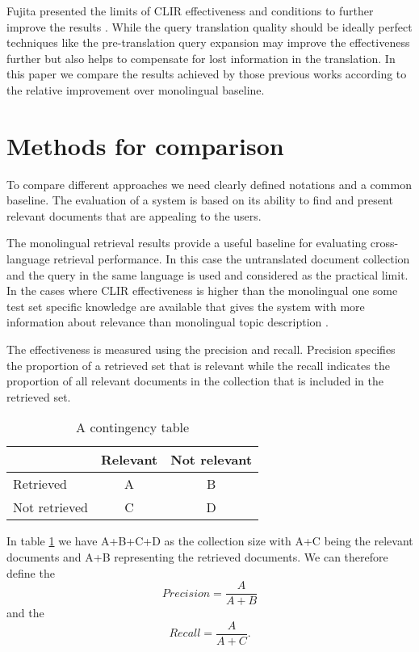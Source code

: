 \documentclass[journal]{IEEEtran}
\begin{document}
Fujita presented the limits of CLIR effectiveness and conditions to further improve the results \cite{fujita01}.
While the query translation quality should be ideally perfect techniques like the pre-translation query expansion may improve the effectiveness further but also helps to compensate for lost information in the translation.
In this paper we compare the results achieved by those previous works according to the relative improvement over monolingual baseline.



\section{Methods for comparison}
To compare different approaches we need clearly defined notations and a common baseline.
The evaluation of a system is based on its ability to find and present relevant documents that are appealing to the users.

The monolingual retrieval results provide a useful baseline for evaluating cross-language retrieval performance.
In this case the untranslated document collection and the query in the same language is used and considered as the practical limit.
In the cases where CLIR effectiveness is higher than the monolingual one some test set specific knowledge are available that gives the system with more information about relevance than monolingual topic description \cite{xu00}.

The effectiveness is measured using the precision and recall.
Precision specifies the proportion of a retrieved set that is relevant while the recall indicates the proportion of all relevant documents in the collection that is included in the retrieved set.

\begin{table}[h]
\caption{A contingency table}
\label{contTable}
\begin{center}
\begin{tabular}{ | l | c | c | }
	\hline
				& Relevant	& Not relevant	\\ \hline
	Retrieved		& A		& B			\\ \hline
	Not retrieved	& C		& D			\\
	\hline
\end{tabular}
\end{center}
\end{table}

In table \ref{contTable} we have A+B+C+D as the collection size with A+C being the relevant documents and A+B representing the retrieved documents.
We can therefore define the
\begin{equation}
\label{precision}
Precision = \frac{A}{A+B}
\end{equation}
and the
\begin{equation}
\label{recall}
Recall = \frac{A}{A+C}.
\end{equation}
\end{document}
